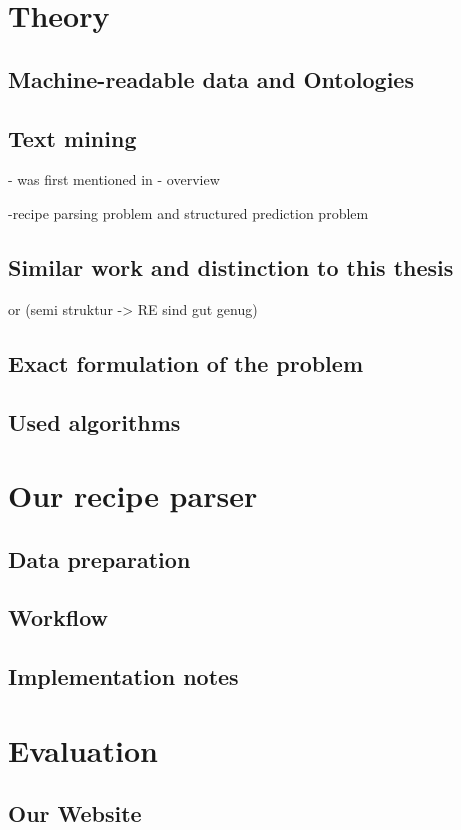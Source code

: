 \documentclass[12pt, twoside]{report}
\begin{document}
\chapter{Theory}
\section{Machine-readable data and Ontologies}
\section{Text mining}
- was first mentioned in \parencite{KDT}
- overview \parencite{surveyOfTextMining}

-recipe parsing problem and structured prediction problem 

\section{Similar work and distinction to this thesis}
\cite{ingredientNetworks} or \cite{recipeRecommendation} (semi struktur -> RE sind gut genug)


\section{Exact formulation of the problem}
\section{Used algorithms}


\chapter{Our recipe parser}
\section{Data preparation}
\section{Workflow}
\section{Implementation notes}

\chapter{Evaluation}
\section{Our Website}
\end{document}
